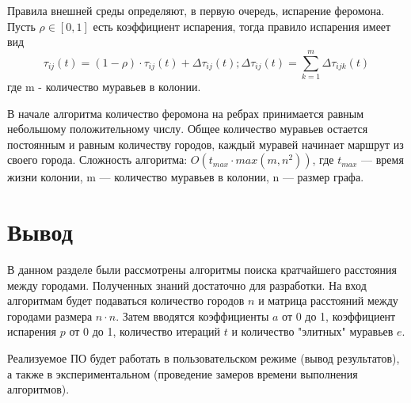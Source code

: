 Правила внешней среды определяют, в первую очередь, испарение феромона. Пусть
$\rho \in [0, 1]$ есть коэффициент испарения, тогда правило испарения имеет вид
\begin{equation}
\tau_{ij}(t) = (1 - \rho) \cdot \tau_{ij}(t) + \Delta \tau_{ij}(t); \Delta \tau_{ij}(t) = \sum\limits_{k=1}^m \Delta \tau_{ijk}(t)
\end{equation}
где m - количество муравьев в колонии. 

В начале алгоритма количество феромона на ребрах принимается равным небольшому
положительному числу. Общее количество муравьев остается постоянным и равным количеству городов, каждый муравей начинает маршрут из своего города. 
Сложность алгоритма: $O(t_{max} \cdot max(m, n^2))$, где $t_{max}$ — время жизни колонии, m — количество муравьев в колонии, n — размер графа.

\newpage
\section{Вывод}

В данном разделе были рассмотрены алгоритмы поиска кратчайшего расстояния между городами. Полученных знаний достаточно для разработки. На вход алгоритмам будет подаваться количество городов $n$ и матрица расстояний между городами размера $n \cdot n$. Затем вводятся коэффициенты $a$ от 0 до 1, коэффициент испарения $p$ от 0 до 1, количество итераций $t$ и количество "элитных" муравьев $e$.

Реализуемое ПО будет работать в пользовательском режиме (вывод результатов), а также в экспериментальном (проведение замеров времени выполнения алгоритмов).